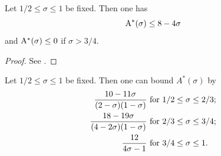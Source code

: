 \begin{proposition}\label{zeroe-lindelof}  Let $1/2 \leq \sigma \leq 1$ be fixed.  Then one has
    $$ \mathrm{A}^*(\sigma) \leq 8 - 4\sigma$$
    and $\mathrm{A}^*(\sigma) \leq 0$ if $\sigma > 3/4$.
\end{proposition}

\begin{proof} See \cite[Lemma 4]{heath_brown_consecutive_II}.
\end{proof}

\begin{theorem}\label{hb-energy-bound}\cite[Theorem 2]{heathbrown_zero_1979}  Let $1/2 \leq \sigma \leq 1$ be fixed.  Then one can bound $A^*(\sigma)$ by
    \begin{align*}
        \frac{10-11\sigma}{(2-\sigma)(1-\sigma)} & \hbox{ for } 1/2 \leq \sigma \leq 2/3;\\
        \frac{18-19\sigma}{(4-2\sigma)(1-\sigma)} & \hbox{ for } 2/3 \leq \sigma \leq 3/4;\\
        \frac{12}{4\sigma-1} & \hbox{ for } 3/4 \leq \sigma \leq 1.
    \end{align*}
\end{theorem}

\literature
{}
\derived
{}

